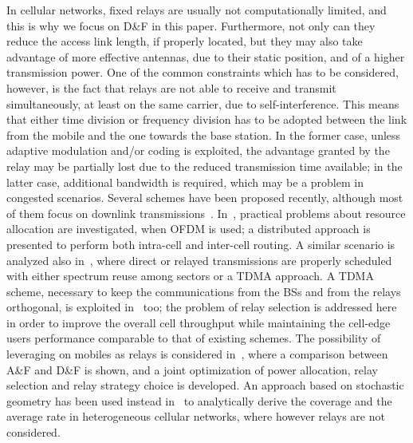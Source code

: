 \documentclass[12pt, letterpaper, onecolumn, draftcls]{IEEEtran}
\begin{document}
In cellular networks, fixed relays are usually not computationally limited, and this is why we focus on D\&F in this paper.
Furthermore, not only can they reduce the access link length, if properly located, but they may also take advantage of more effective antennas, due to their static position, and of a higher transmission power.
One of the common constraints which has to be considered, however, is the fact that relays are not able to receive and transmit simultaneously, at least on the same carrier, due to self-interference. This means that either time division or frequency division has to be adopted between the link from the mobile and the one towards the base station.
In the former case, unless adaptive modulation and/or coding is exploited, the advantage granted by the relay may be partially lost due to the reduced transmission time available; in the latter case, additional bandwidth is required, which may be a problem in congested scenarios.
Several schemes have been proposed recently, although most of them focus on downlink transmissions~\cite{relOFDM,oppOFDM,RelSel,Opt_powRelSel}. In~\cite{relOFDM}, practical problems about resource allocation are investigated, when OFDM is used; a distributed approach is presented to perform both intra-cell and inter-cell routing. A similar scenario is analyzed also in~\cite{oppOFDM}, where direct or relayed transmissions are properly scheduled with either spectrum reuse among sectors or a TDMA approach. A TDMA scheme, necessary to keep the communications from the BSs and from the relays orthogonal, is exploited in~\cite{RelSel} too; the problem of relay selection is addressed here in order to improve the overall cell throughput while maintaining the cell-edge users performance comparable to that of existing schemes.
The possibility of leveraging on mobiles as relays is considered in~\cite{Opt_powRelSel}, where a comparison between A\&F and D\&F is shown, and a joint optimization of power allocation, relay selection and relay strategy choice is developed.
An approach based on stochastic geometry has been used instead in~\cite{Baccelli} to analytically derive the coverage and the average rate in heterogeneous cellular networks, where however relays are not considered.
\end{document}
